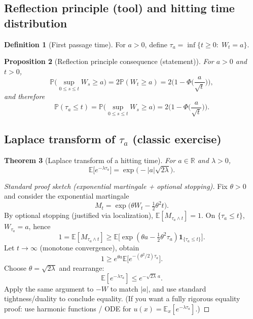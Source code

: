 \documentclass[11pt]{article}
\newtheorem{theorem}{Theorem}[section]
\newtheorem{proposition}[theorem]{Proposition}
\theoremstyle{definition}
\newtheorem{definition}[theorem]{Definition}
\theoremstyle{remark}
\newcommand{\E}{\mathbb{E}}
\newcommand{\Pbb}{\mathbb{P}}
\newcommand{\R}{\mathbb{R}}
\begin{document}
\subsection{Reflection principle (tool) and hitting time distribution}

\begin{definition}[First passage time]
For $a>0$, define $\tau_a=\inf\{t\ge0:\; W_t=a\}$.
\end{definition}

\begin{proposition}[Reflection principle consequence (statement)]
For $a>0$ and $t>0$,
\[
\Pbb\Big(\sup_{0\le s\le t}W_s \ge a\Big) = 2\Pbb(W_t\ge a)
= 2\Big(1-\Phi\Big(\frac{a}{\sqrt{t}}\Big)\Big),
\]
and therefore
\[
\Pbb(\tau_a\le t)=\Pbb\Big(\sup_{0\le s\le t}W_s \ge a\Big)
=2\Big(1-\Phi\Big(\frac{a}{\sqrt{t}}\Big)\Big).
\]
\end{proposition}

\subsection{Laplace transform of $\tau_a$ (classic exercise)}

\begin{theorem}[Laplace transform of a hitting time]
For $a\in\R$ and $\lambda>0$,
\[
\E\big[e^{-\lambda \tau_a}\big]=\exp\big(-|a|\sqrt{2\lambda}\big).
\]
\end{theorem}

\begin{proof}[Standard proof sketch (exponential martingale + optional stopping)]
Fix $\theta>0$ and consider the exponential martingale
\[
M_t=\exp\Big(\theta W_t-\tfrac12\theta^2 t\Big).
\]
By optional stopping (justified via localization), $\E[M_{\tau_a\wedge t}]=1$.
On $\{\tau_a\le t\}$, $W_{\tau_a}=a$, hence
\[
1=\E[M_{\tau_a\wedge t}]
\ge \E\big[\exp(\theta a-\tfrac12\theta^2 \tau_a)\mathbf{1}_{\{\tau_a\le t\}}\big].
\]
Let $t\to\infty$ (monotone convergence), obtain
\[
1\ge e^{\theta a}\E\big[e^{-(\theta^2/2)\tau_a}\big].
\]
Choose $\theta=\sqrt{2\lambda}$ and rearrange:
\[
\E[e^{-\lambda\tau_a}]\le e^{-\sqrt{2\lambda}\,a}.
\]
Apply the same argument to $-W$ to match $|a|$, and use standard tightness/duality to conclude equality.
(If you want a fully rigorous equality proof: use harmonic functions / ODE for $u(x)=\E_x[e^{-\lambda\tau_a}]$.)
\end{proof}

% 

\end{document}
